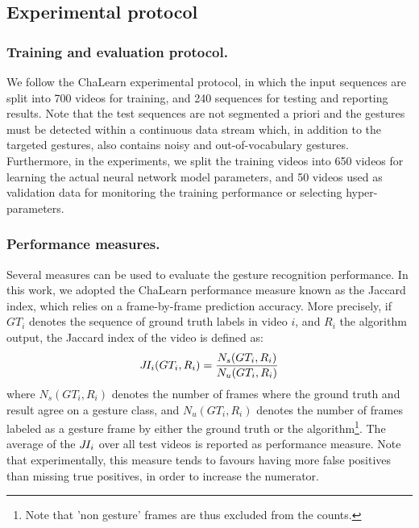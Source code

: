 \subsection{Experimental protocol}

\subsubsection{Training and evaluation protocol.}

We follow the ChaLearn experimental protocol, in which the input sequences are split into 700 videos for training, and 240 sequences for testing and reporting results.
Note that the   test sequences  are not segmented a priori and the gestures must be detected within a continuous data stream
which, in addition to the targeted gestures, also contains noisy and out-of-vocabulary gestures.
%
Furthermore, in the experiments, we split the training videos into 650 videos for learning the actual neural network model parameters, and 50 videos 
used as validation data for monitoring the training performance or selecting hyper-parameters.


\subsubsection{Performance measures.}

Several measures can be used to evaluate the gesture recognition performance.
%
In this work, we adopted the ChaLearn performance measure known as the Jaccard index, which relies on a frame-by-frame prediction accuracy. 
More precisely, if $GT_i$ denotes the sequence of ground truth labels in video $i$, and $R_i$ the algorithm output, the Jaccard index 
of the video is defined as:
\begin{equation}
J\hspace*{-0.1em}I_i(GT_i, R_i) = \frac{N_s(GT_i, R_i)}{N_u(GT_i, R_i)}
\end{equation}
where $N_s(GT_i, R_i)$ denotes the number of frames where the ground truth and result agree on a gesture class, 
and $N_u(GT_i, R_i)$ denotes the number of frames labeled as a gesture frame by  either the ground truth or the algorithm\footnote{Note that 'non gesture' 
frames are thus excluded from the counts.}. The average of the $J\hspace*{-0.1em}I_i$ over all test videos is reported as performance measure.
%
Note that experimentally, this measure tends to favours having more false positives than missing true positives, in order to increase the numerator.

